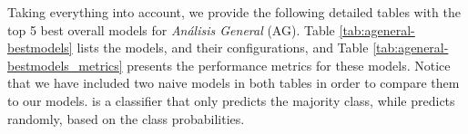 Taking everything into account, we provide the following detailed tables with the top 5 best overall models for \textit{Análisis General} (AG). Table \ref{tab:ageneral-bestmodels} lists the models, and their configurations, and Table \ref{tab:ageneral-bestmodels_metrics} presents the performance metrics for these models. Notice that we have included two naive models in both tables in order to compare them to our models. {\agmajor} is a classifier that only predicts the majority class, while {\agrandom} predicts randomly, based on the class probabilities.


\begin{table}[H]
    \centering
    \begingroup
    \small %
    \endgroup
\end{table}




